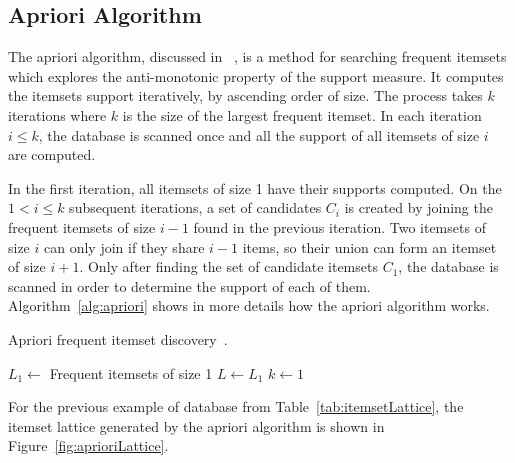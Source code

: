 \subsection{Apriori Algorithm}
The apriori algorithm, discussed in ~\citet{Pasquier99efficientmining}, is a method for searching frequent itemsets
which explores the anti-monotonic property of the support measure. It computes the itemsets support iteratively, by
ascending order of size. The process takes $k$ iterations where $k$ is the size of the largest frequent itemset. In each
iteration $i \leq k$, the database is scanned once and all the support of all itemsets of size $i$ are computed.

In the first iteration, all itemsets of size 1 have their supports computed. On the $1 < i \leq k$ subsequent
iterations, a set of candidates $C_i$ is created by joining the frequent itemsets of size $i-1$ found in the previous
iteration. Two itemsets of size $i$ can only join if they share $i-1$ items, so their union can form an itemset of
size
$i+1$. Only after finding the set of candidate itemsets $C_1$, the database is scanned in order to determine the
support of each of them. Algorithm~\ref{alg:apriori} shows in more details how the apriori algorithm works.

\begin{algorithm}[h!]
  \caption{Apriori frequent itemset discovery~\citep{Pasquier99efficientmining}.}

  $L_1 \leftarrow$ Frequent itemsets of size 1 \;
  $L \leftarrow L_1$ \;
  $k \leftarrow 1$ \;
   \;
 \label{alg:apriori}
\end{algorithm}

For the previous example of database from Table~\ref{tab:itemsetLattice}, the itemset lattice generated by the apriori
algorithm is shown in Figure~\ref{fig:aprioriLattice}. 

